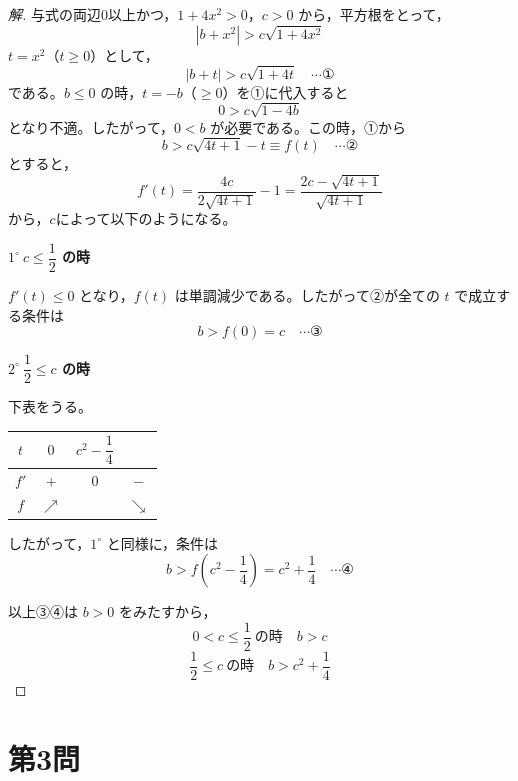 \documentclass[../main.tex]{subfiles}
\begin{document}
\begin{proof}[解]
  与式の両辺0以上かつ，$1+4x^2>0$，$c>0$ から，平方根をとって，
  \[
    |b+x^2|>c\sqrt{1+4x^2}
  \]
  $t=x^2$（$t\ge0$）として，
  \[
    |b+t|>c\sqrt{1+4t} \quad \cdots \text{①}
  \]
  である。$b\le0$ の時，$t=-b$（$\ge0$）を①に代入すると
  \[
    0>c\sqrt{1-4b}
  \]
  となり不適。したがって，$0<b$ が必要である。この時，①から
  \[
    b>c\sqrt{4t+1}-t\equiv f(t) \quad \cdots \text{②}
  \]
  とすると，
  \[
    f'(t)=\frac{4c}{2\sqrt{4t+1}}-1=\frac{2c-\sqrt{4t+1}}{\sqrt{4t+1}}
  \]
  から，$c$によって以下のようになる。

  \textbf{$1^\circ\ c\le\dfrac{1}{2}$ の時}

  $f'(t)\le0$ となり，$f(t)$ は単調減少である。したがって②が全ての $t$ で成立する条件は
  \[
    b>f(0)=c \quad \cdots \text{③}
  \]

  \textbf{$2^\circ\ \dfrac{1}{2}\le c$ の時}

  下表をうる。
  \begin{center}
    \begin{tabular}{c|c|c|c}
      $t$ & $0$ & $c^2-\dfrac14$ & \\
      \hline
      $f'$ & $+$ & $0$ & $-$ \\
      \hline
      $f$ & $\nearrow$ & & $\searrow$
    \end{tabular}
  \end{center}

  したがって，$1^\circ$ と同様に，条件は
  \[
    b>f\left(c^2-\frac14\right)=c^2+\frac14 \quad \cdots \text{④}
  \]

  以上③④は $b>0$ をみたすから，
  \[
    0<c\le\frac12\ \text{の時}\quad b>c
  \]
  \[
    \frac12\le c\ \text{の時}\quad b>c^2+\frac14
  \]
\end{proof}

\newpage

\section*{第3問}
\end{document}
